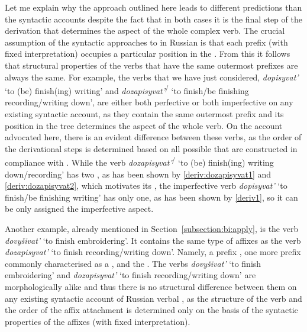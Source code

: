 Let me explain why the approach outlined here leads to different predictions than the syntactic accounts despite the fact that in both cases it is the final step of the derivation that determines the aspect of the whole complex verb. The crucial assumption of the syntactic approaches to  in Russian is that each prefix (with fixed interpretation) occupies a particular position in the . From this it follows that structural properties of the verbs that have the same outermost prefixes are always the same. For example, the verbs that we have just considered, \textit{dopisyvat'}\textsuperscript{\IPF} `to (be) finish(ing) writing' and \textit{dozapisyvat'}\textsuperscript{\IPF\slash\PF} `to finish/be finishing recording/writing down', are either both perfective or both imperfective on any existing syntactic  account, as they contain the same outermost prefix  and its position in the tree determines the aspect of the whole verb. On the account advocated here, there is an evident difference between these verbs, as the order of the derivational steps is determined based on all possible  that are constructed in compliance with . While the verb \textit{dozapisyvat'}\textsuperscript{\IPF\slash\PF} `to (be) finish(ing) writing down/recording' has two , as has been shown by \ref{deriv:dozapisyvat1} and \ref{deriv:dozapisyvat2}, which motivates its , the imperfective verb \textit{dopisyvat'}\textsuperscript{\IPF} `to finish/be finishing writing' has only one, as has been shown by \ref{deriv1}, so it can be only assigned the imperfective aspect.

Another example, already mentioned in Section~\ref{subsection:bi:apply}, is the verb \textit{dovy\v{s}ivat'} `to finish embroidering'. It contains the same type of affixes as the verb \textit{dozapisyvat'} `to finish recording/writing down'. Namely, a  prefix , one more prefix commonly characterised as a , and the . The verbs \textit{dovy\v{s}ivat'} `to finish embroidering' and \textit{dozapisyvat'} `to finish recording/writing down' are morphologically alike and thus there is no structural difference between them on any existing syntactic account of Russian verbal , as the structure of the verb and the order of the affix attachment is determined only on the basis of the syntactic properties of the affixes (with fixed interpretation).
 
